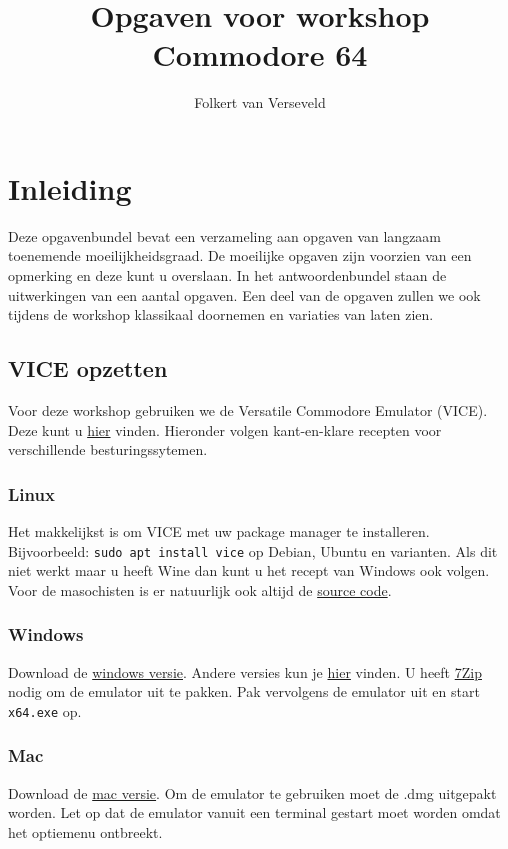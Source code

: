 \documentclass{article}
\title{Opgaven voor workshop Commodore 64}
\author{Folkert van Verseveld}
\begin{document}
\maketitle

\section{Inleiding}

Deze opgavenbundel bevat een verzameling aan opgaven van langzaam toenemende moeilijkheidsgraad.
De moeilijke opgaven zijn voorzien van een opmerking en deze kunt u overslaan.
In het antwoordenbundel staan de uitwerkingen van een aantal opgaven.
Een deel van de opgaven zullen we ook tijdens de workshop klassikaal doornemen en variaties van laten zien.

\subsection{VICE opzetten}
Voor deze workshop gebruiken we de Versatile Commodore Emulator (VICE).
Deze kunt u \href{http://vice-emu.sourceforge.net/}{hier} vinden.
Hieronder volgen kant-en-klare recepten voor verschillende besturingssytemen.

\subsubsection{Linux}
Het makkelijkst is om VICE met uw package manager te installeren. Bijvoorbeeld: \verb:sudo apt install vice: op Debian, Ubuntu en varianten.
Als dit niet werkt maar u heeft Wine dan kunt u het recept van Windows ook volgen.
Voor de masochisten is er natuurlijk ook altijd de \href{http://sourceforge.net/projects/vice-emu/files/releases/vice-3.1.tar.gz/download}{source code}.

\subsubsection{Windows}
Download de \href{http://sourceforge.net/projects/vice-emu/files/releases/binaries/windows/WinVICE-3.1-x64.7z/download}{windows versie}.
Andere versies kun je \href{http://vice-emu.sourceforge.net/windows.html}{hier} vinden.
U heeft \href{http://www.7-zip.org/}{7Zip} nodig om de emulator uit te pakken.
Pak vervolgens de emulator uit en start \verb:x64.exe: op.

\subsubsection{Mac}
Download de \href{http://sourceforge.net/projects/vice-emu/files/releases/binaries/macosx/vice-macosx-sdl-x86_64-10.12-3.1.dmg/download}{mac versie}.
Om de emulator te gebruiken moet de .dmg uitgepakt worden.
Let op dat de emulator vanuit een terminal gestart moet worden omdat het optiemenu ontbreekt.
\end{document}
